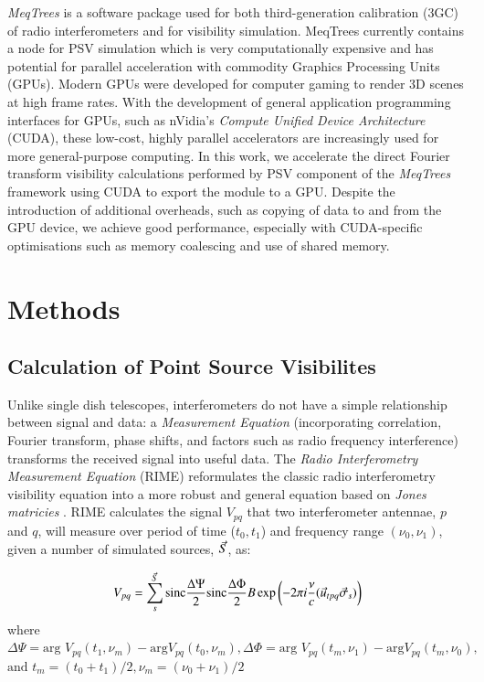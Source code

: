 \documentclass[11pt,twoside]{article}
\begin{document}
\emph{MeqTrees} is a software package used for both third-generation
calibration (3GC) of radio interferometers and for  visibility simulation.
MeqTrees currently contains a node for PSV simulation which is very
computationally expensive and has potential for parallel acceleration with
commodity Graphics Processing Units (GPUs). \label{sec:cuda}  Modern GPUs were
developed for computer gaming to render 3D scenes at high frame rates. With
the development of general application programming interfaces for GPUs, such
as nVidia's \emph{Compute Unified Device Architecture} (CUDA), these low-cost,
highly parallel accelerators are increasingly used for more general-purpose
computing. In this work, we accelerate the direct Fourier transform visibility
calculations performed by PSV component of the \emph{MeqTrees} framework using
CUDA to export the module to a GPU.  Despite the introduction of additional
overheads, such as copying of data to and from the GPU device,  we achieve
good performance, especially with CUDA-specific optimisations such as memory
coalescing and  use of shared memory.


\section{Methods}
\subsection{Calculation of Point Source Visibilites}
\label{sec:meqtrees}

Unlike single dish telescopes, interferometers do not have a simple
relationship between signal and data: a \emph{Measurement Equation}
(incorporating correlation, Fourier transform, phase shifts, and factors such
as radio frequency interference) transforms the received signal into useful
data.  The \emph{Radio Interferometry Measurement Equation} (RIME)
reformulates the classic radio interferometry visibility equation into a more
robust and general equation based on \emph{Jones matricies}
\citep{Smirnov2011}. RIME calculates the signal $V_{pq}$ that two
interferometer antennae, $p$ and $q$, will measure over period of time ($t_0,
t_1$)  and  frequency range $(\nu_0, \nu_1)$, given a number of simulated
sources, $\vec{S}$, as:

\begin{equation}
V_{pq} = \sum_s^{\vec{S}}
\mbox{sinc}\frac{\Delta\Psi}{2}\mbox{sinc}\frac{\Delta\Phi}{2}
B\exp\left({-2\pi i\frac{\nu}{c}(\vec{u}_{tpq}\vec{\sigma}_s)}\right)
\label{eq:RIME}
\end{equation}
where
$\Delta\Psi = \mbox{arg }V_{pq}(t_1,\nu_m) - \mbox{arg
}V_{pq}(t_0,\nu_m), 
\Delta\Phi = \mbox{arg }V_{pq}(t_m,\nu_1) - \mbox{arg
}V_{pq}(t_m,\nu_0),$
$\mbox{and } t_m = (t_0 + t_1)/2, \nu_m = (\nu_0 + \nu_1)/2 $
\end{document}

